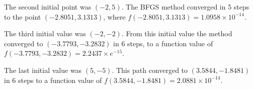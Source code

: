 \documentclass[11pt, oneside]{article}
\begin{document}
\begin{enumerate}
    The second initial point was $(-2, 5)$.
    The BFGS method converged in 5 steps to the point $(-2.8051, 3.1313)$,
    where $f(-2.8051, 3.1313) = 1.0958 \times 10^{-14}$.

    The third initial value was $(-2, -2)$.
    From this initial value the method converged to $(-3.7793, -3.2832)$ in 6
    steps, to a function value of $f(-3.7793, -3.2832) = 2.2437\times e^{-15}$.

    The last initial value was $(5, -5)$.
    This path converged to $(3.5844, -1.8481)$ in 6 steps to a function value
    of $f(3.5844, -1.8481) = 2.0881 \times 10^{-14}$.
\end{enumerate}
\end{document}
